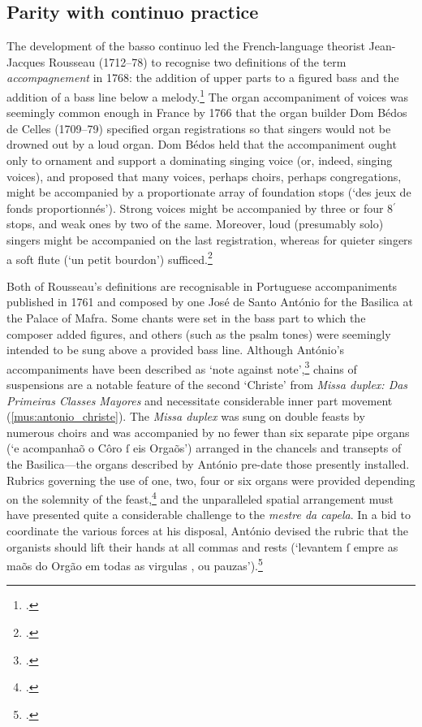 \subsection{Parity with continuo practice}
The development of the basso continuo led the French-language theorist Jean-Jacques Rousseau (1712--78) to recognise two definitions of the term \emph{accompagnement} in 1768: the addition of upper parts to a figured bass and the addition of a bass line below a melody.\footcites[6]{RousseauDictionnairemusique1768}[47]{JambouDoscategoriascanto2007}
The organ accompaniment of voices was seemingly common enough in France by 1766 that the organ builder Dom Bédos de Celles (1709--79) specified organ registrations so that singers would not be drowned out by a loud organ.
Dom Bédos held that the accompaniment ought only to ornament and support a dominating singing voice (or, indeed, singing voices), and proposed that many voices, perhaps choirs, perhaps congregations, might be accompanied by a proportionate array of foundation stops (`des jeux de fonds proportionnés').
Strong voices might be accompanied by three or four 8$^\prime$ stops, and weak ones by two of the same.
Moreover, loud (presumably solo) singers might be accompanied on the last registration, whereas for quieter singers a soft flute (`un petit bourdon') sufficed.\footcite[533]{deCellesartfacteurorgues1766}

Both of Rousseau's definitions are recognisable in Portuguese accompaniments published in 1761 and composed by one José de Santo António for the Basilica at the Palace of Mafra.
Some chants were set in the bass part to which the composer added figures, and others (such as the psalm tones) were seemingly intended to be sung above a provided bass line.
Although António's accompaniments have been described as `note against note',\footcite[118--19]{CardosoEmbuscapeculiar2012} chains of suspensions are a notable feature of the second `Christe' from \emph{Missa duplex: Das Primeiras Classes Mayores} and necessitate considerable inner part movement (\cref{mus:antonio_christe}).
The \emph{Missa duplex} was sung on double feasts by numerous choirs and was accompanied by no fewer than six separate pipe organs (`e acompanhaõ o Côro ſ\kern -0.5pt eis Orgaõs') arranged in the chancels and transepts of the Basilica---the organs described by António pre-date those presently installed.
Rubrics governing the use of one, two, four or six organs were provided depending on the solemnity of the feast,\footcite[89--90]{VazSixOrgansBasilica2015} and the unparalleled spatial arrangement must have presented quite a considerable challenge to the \emph{mestre da capela}.
In a bid to coordinate the various forces at his disposal, António devised the rubric that the organists should lift their hands at all commas and rests (`levantem ſ\kern -0.5pt empre as maõs do Orgão em todas as virgulas , ou pauzas').\footcite[p.~2 and unpaginated `Advertencias' I, XXIII]{SantoAntonioAcompanhamentosmissassequencias1761}

